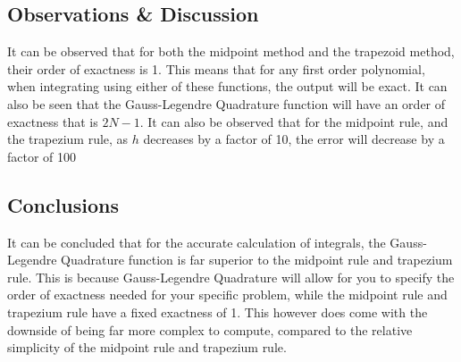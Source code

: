 \documentclass[11pt]{article}
\begin{document}
    \hypertarget{observations-discussion}{%
\subsection{Observations \& Discussion}\label{observations-discussion}}

It can be observed that for both the midpoint method and the trapezoid
method, their order of exactness is 1. This means that for any first
order polynomial, when integrating using either of these functions, the
output will be exact. It can also be seen that the Gauss-Legendre
Quadrature function will have an order of exactness that is \(2N - 1\).
It can also be observed that for the midpoint rule, and the trapezium
rule, as \(h\) decreases by a factor of 10, the error will decrease by a
factor of 100

\hypertarget{conclusions}{%
\subsection{Conclusions}\label{conclusions}}

It can be concluded that for the accurate calculation of integrals, the
Gauss-Legendre Quadrature function is far superior to the midpoint rule
and trapezium rule. This is because Gauss-Legendre Quadrature will allow
for you to specify the order of exactness needed for your specific
problem, while the midpoint rule and trapezium rule have a fixed
exactness of 1. This however does come with the downside of being far
more complex to compute, compared to the relative simplicity of the
midpoint rule and trapezium rule.


    
    
    
\end{document}
